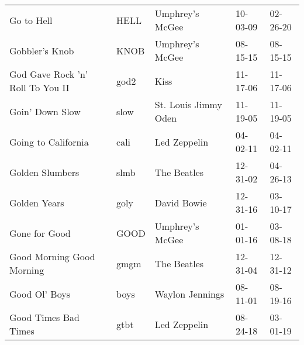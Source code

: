 \begin{longtable}{p{}p{}p{}p{}p{}}
                                                              Go to Hell &          HELL &                                          Umphrey's McGee &              10-03-09 &             02-26-20 \\
                                                          Gobbler's Knob &          KNOB &                                          Umphrey's McGee &              08-15-15 &             08-15-15 \\
                                        God Gave Rock 'n' Roll To You II &          god2 &                                                     Kiss &              11-17-06 &             11-17-06 \\
                                                         Goin' Down Slow &          slow &                                     St. Louis Jimmy Oden &              11-19-05 &             11-19-05 \\
                                                     Going to California &          cali &                                             Led Zeppelin &              04-02-11 &             04-02-11 \\
                                                         Golden Slumbers &          slmb &                                              The Beatles &              12-31-02 &             04-26-13 \\
                                                            Golden Years &          goly &                                              David Bowie &              12-31-16 &             03-10-17 \\
                                                           Gone for Good &          GOOD &                                          Umphrey's McGee &              01-01-16 &             03-08-18 \\
                                               Good Morning Good Morning &          gmgm &                                              The Beatles &              12-31-04 &             12-31-12 \\
                                                           Good Ol' Boys &          boys &                                          Waylon Jennings &              08-11-01 &             08-19-16 \\
                                                    Good Times Bad Times &          gtbt &                                             Led Zeppelin &              08-24-18 &             03-01-19 \\

\end{longtable}
